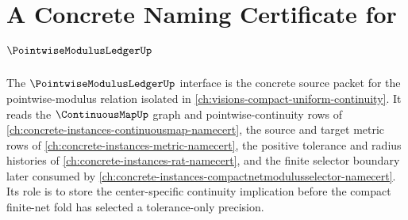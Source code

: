 \chapter{A Concrete Naming Certificate for $\PointwiseModulusLedgerUp$}
\label{ch:concrete-instances-pointwise-modulus-ledger-namecert}

The $\PointwiseModulusLedgerUp$ interface is the concrete source packet for the pointwise-modulus relation isolated in \autoref{ch:visions-compact-uniform-continuity}. It reads the $\ContinuousMapUp$ graph and pointwise-continuity rows of \autoref{ch:concrete-instances-continuousmap-namecert}, the source and target metric rows of \autoref{ch:concrete-instances-metric-namecert}, the positive tolerance and radius histories of \autoref{ch:concrete-instances-rat-namecert}, and the finite selector boundary later consumed by \autoref{ch:concrete-instances-compactnetmodulusselector-namecert}. Its role is to store the center-specific continuity implication before the compact finite-net fold has selected a tolerance-only precision.



